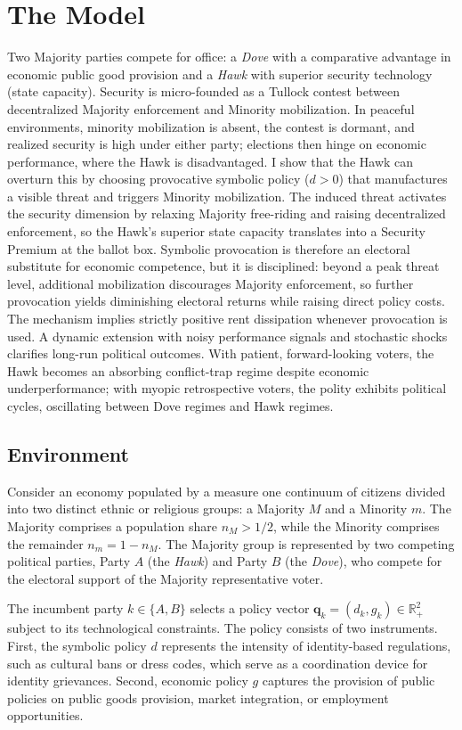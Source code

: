 \documentclass[11pt,twoside]{extarticle}
\begin{document}
\section{The Model} \label{sec:model}
Two Majority parties compete for office: a \emph{Dove} with a comparative advantage in economic public good provision and a \emph{Hawk} with superior security technology (state capacity). Security is micro-founded as a Tullock contest between decentralized Majority enforcement and Minority mobilization. In peaceful environments, minority mobilization is absent, the contest is dormant, and realized security is high under either party; elections then hinge on economic performance, where the Hawk is disadvantaged. I show that the Hawk can overturn this by choosing provocative symbolic policy ($d>0$) that manufactures a visible threat and triggers Minority mobilization. The induced threat activates the security dimension by relaxing Majority free-riding and raising decentralized enforcement, so the Hawk's superior state capacity translates into a Security Premium at the ballot box. Symbolic provocation is therefore an electoral substitute for economic competence, but it is disciplined: beyond a peak threat level, additional mobilization discourages Majority enforcement, so further provocation yields diminishing electoral returns while raising direct policy costs. The mechanism implies strictly positive rent dissipation whenever provocation is used. A dynamic extension with noisy performance signals and stochastic shocks clarifies long-run political outcomes. With patient, forward-looking voters, the Hawk becomes an absorbing conflict-trap regime despite economic underperformance; with myopic retrospective voters, the polity exhibits political cycles, oscillating between Dove regimes and Hawk regimes.

\subsection{Environment}
Consider an economy populated by a measure one continuum of citizens divided into two distinct ethnic or religious groups: a Majority $M$ and a Minority $m$. The Majority comprises a population share $n_M > 1/2$, while the Minority comprises the remainder $n_m = 1 - n_M$. The Majority group is represented by two competing political parties, Party $A$ (the \emph{Hawk}) and Party $B$ (the \emph{Dove}), who compete for the electoral support of the Majority representative voter.

The incumbent party $k\in\{A,B\}$ selects a policy vector $\mathbf{q}_k=(d_k,g_k)\in\mathbb{R}_+^2$ subject to its technological constraints. The policy consists of two instruments. First, the symbolic policy $d$ represents the intensity of identity-based regulations, such as cultural bans or dress codes, which serve as a coordination device for identity grievances. Second, economic policy $g$ captures the provision of public policies on public goods provision, market integration, or employment opportunities.
\end{document}
